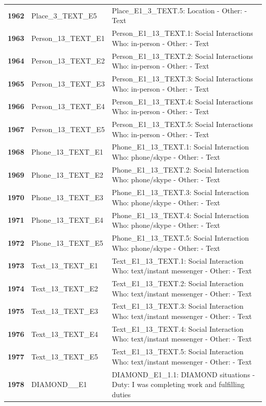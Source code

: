 \documentclass[
  letterpaper,
  DIV=11,
  numbers=noendperiod]{scrartcl}
\begin{document}
\begin{longtable}[t]{>{}cll}
\textbf{1962} & Place\_3\_TEXT\_E5 & Place\_E1\_3\_TEXT.5: Location - Other: - Text\\
\textbf{1963} & Person\_13\_TEXT\_E1 & Person\_E1\_13\_TEXT.1: Social Interactions Who: in-person - Other: - Text\\
\textbf{1964} & Person\_13\_TEXT\_E2 & Person\_E1\_13\_TEXT.2: Social Interactions Who: in-person - Other: - Text\\
\textbf{1965} & Person\_13\_TEXT\_E3 & Person\_E1\_13\_TEXT.3: Social Interactions Who: in-person - Other: - Text\\
\addlinespace
\textbf{1966} & Person\_13\_TEXT\_E4 & Person\_E1\_13\_TEXT.4: Social Interactions Who: in-person - Other: - Text\\
\textbf{1967} & Person\_13\_TEXT\_E5 & Person\_E1\_13\_TEXT.5: Social Interactions Who: in-person - Other: - Text\\
\textbf{1968} & Phone\_13\_TEXT\_E1 & Phone\_E1\_13\_TEXT.1: Social Interaction Who: phone/skype - Other: - Text\\
\textbf{1969} & Phone\_13\_TEXT\_E2 & Phone\_E1\_13\_TEXT.2: Social Interaction Who: phone/skype - Other: - Text\\
\textbf{1970} & Phone\_13\_TEXT\_E3 & Phone\_E1\_13\_TEXT.3: Social Interaction Who: phone/skype - Other: - Text\\
\addlinespace
\textbf{1971} & Phone\_13\_TEXT\_E4 & Phone\_E1\_13\_TEXT.4: Social Interaction Who: phone/skype - Other: - Text\\
\textbf{1972} & Phone\_13\_TEXT\_E5 & Phone\_E1\_13\_TEXT.5: Social Interaction Who: phone/skype - Other: - Text\\
\textbf{1973} & Text\_13\_TEXT\_E1 & Text\_E1\_13\_TEXT.1: Social Interaction Who: text/instant messenger - Other: - Text\\
\textbf{1974} & Text\_13\_TEXT\_E2 & Text\_E1\_13\_TEXT.2: Social Interaction Who: text/instant messenger - Other: - Text\\
\textbf{1975} & Text\_13\_TEXT\_E3 & Text\_E1\_13\_TEXT.3: Social Interaction Who: text/instant messenger - Other: - Text\\
\addlinespace
\textbf{1976} & Text\_13\_TEXT\_E4 & Text\_E1\_13\_TEXT.4: Social Interaction Who: text/instant messenger - Other: - Text\\
\textbf{1977} & Text\_13\_TEXT\_E5 & Text\_E1\_13\_TEXT.5: Social Interaction Who: text/instant messenger - Other: - Text\\
\textbf{1978} & DIAMOND\_\_E1 & DIAMOND\_E1\_1.1: DIAMOND situations - Duty: I was completing work and fulfilling duties\\

\end{longtable}
\end{document}
